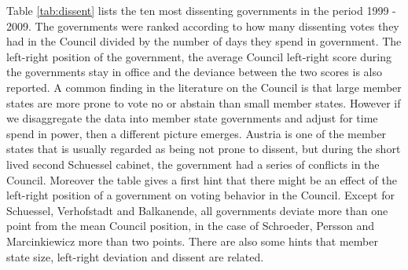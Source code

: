Table \ref{tab:dissent} lists the ten most dissenting governments in the period 1999 - 2009. The governments were ranked according to how many dissenting votes they had in the Council divided by the number of days they spend in government. The left-right position of the government, the average Council left-right score during the governments stay in office and the deviance between the two scores is also reported. A common finding in the literature on the Council is that large member states are more prone to vote no or abstain than small member states. However if we disaggregate the data into member state governments and adjust for time spend in power, then a different picture emerges. Austria is one of the member states that is usually regarded as being not prone to dissent, but during the short lived second Schuessel cabinet, the government had a series of conflicts in the Council. Moreover the table gives a first hint that there might be an effect of the left-right position of a government on voting behavior in the Council. Except for Schuessel, Verhofstadt and Balkanende, all governments deviate more than one point from the mean Council position, in the case of Schroeder, Persson and Marcinkiewicz more than two points. There are also some hints that member state size, left-right deviation and dissent are related. 

\begin{table*}[ht]
\begin{center}
\end{center}
\caption{The Ten Most Dissenting Governments Between 1999 and 2009}
\label{tab:dissent}
\end{table*}

